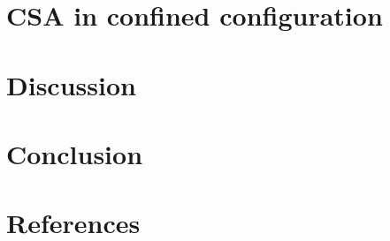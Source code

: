 \documentclass[12pt]{iopart}
\begin{document}
\section{CSA in confined configuration}
\label{confined}
 
\section{Discussion}
\label{discussion}


\section{Conclusion}
\label{conclusion}
 
\ack


\section*{References}


\end{document}
